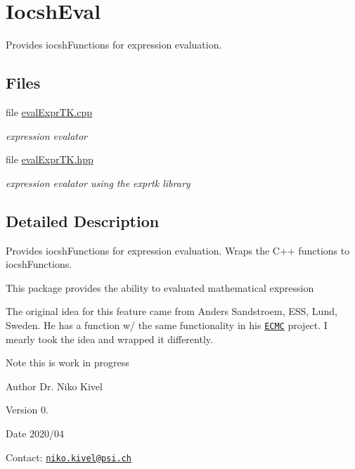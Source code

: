 \hypertarget{group__iocshEval}{\section{Iocsh\-Eval}
\label{group__iocshEval}
}


Provides iocsh\-Functions for expression evaluation.  


\subsection*{Files}
\begin{DoxyCompactItemize}
\item 
file \hyperlink{evalExprTK_8cpp}{eval\-Expr\-T\-K.\-cpp}
\begin{DoxyCompactList}\small\item\em expression evalator \end{DoxyCompactList}\item 
file \hyperlink{evalExprTK_8hpp}{eval\-Expr\-T\-K.\-hpp}
\begin{DoxyCompactList}\small\item\em expression evalator using the exprtk library \end{DoxyCompactList}\end{DoxyCompactItemize}


\subsection{Detailed Description}
Provides iocsh\-Functions for expression evaluation. Wraps the C++ functions to iocsh\-Functions.

This package provides the ability to evaluated mathematical expression

The original idea for this feature came from Anders Sandstroem, E\-S\-S, Lund, Sweden. He has a function w/ the same functionality in his \href{https://github.com/epics-modules/ecmc/}{\tt E\-C\-M\-C} project. I mearly took the idea and wrapped it differently.

\begin{DoxyNote}{Note}
this is work in progress
\end{DoxyNote}
\begin{DoxyAuthor}{Author}
Dr. Niko Kivel
\end{DoxyAuthor}
\begin{DoxyVersion}{Version}
0.
\end{DoxyVersion}
\begin{DoxyDate}{Date}
2020/04
\end{DoxyDate}
Contact\-: \href{mailto:niko.kivel@psi.ch}{\tt niko.\-kivel@psi.\-ch}

